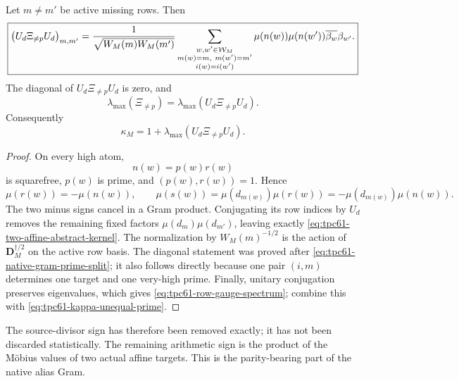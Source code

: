 \begin{proposition}
\label{prop:tpc61-exact-row-gauge}
Let \(m\ne m'\) be active missing rows.  Then
\begin{equation}
 \boxed{
 \bigl(U_d\Xi_{\ne p}U_d\bigr)_{m,m'}
 =\frac{1}{\sqrt{W_M(m)W_M(m')}}
 \sum_{\substack{w,w'\in\mathcal W_M\\
                   m(w)=m,\ m(w')=m'\\
                   i(w)=i(w')}}
 \mu(n(w))\mu(n(w'))
 \overline{\beta_w}\beta_{w'}.}
 \label{eq:tpc61-two-affine-abstract-kernel}
\end{equation}
The diagonal of \(U_d\Xi_{\ne p}U_d\) is zero, and
\begin{equation}
 \lambda_{\max}(\Xi_{\ne p})
 =\lambda_{\max}(U_d\Xi_{\ne p}U_d).
 \label{eq:tpc61-row-gauge-spectrum}
\end{equation}
Consequently
\begin{equation}
 \kappa_M
 =1+\lambda_{\max}(U_d\Xi_{\ne p}U_d).
 \label{eq:tpc61-kappa-parity-gauge}
\end{equation}
\end{proposition}

\begin{proof}
On every high atom,
\[
 n(w)=p(w)r(w)
\]
is squarefree, \(p(w)\) is prime, and \((p(w),r(w))=1\).  Hence
\begin{equation}
 \mu(r(w))=-\mu(n(w)),
 \qquad
 \mu(s(w))
 =\mu(d_{m(w)})\mu(r(w))
 =-\mu(d_{m(w)})\mu(n(w)).
 \label{eq:tpc61-high-sign-calibration}
\end{equation}
The two minus signs cancel in a Gram product.  Conjugating its row indices
by \(U_d\) removes the remaining fixed factors
\(\mu(d_m)\mu(d_{m'})\), leaving exactly
\eqref{eq:tpc61-two-affine-abstract-kernel}.  The normalization by
\(W_M(m)^{-1/2}\) is the action of
\(\mathbf D_M^{\dagger/2}\) on the active row basis.  The diagonal
statement was proved after \eqref{eq:tpc61-native-gram-prime-split}; it
also follows directly because one pair \((i,m)\) determines one target and
one very-high prime.  Finally, unitary conjugation preserves eigenvalues,
which gives \eqref{eq:tpc61-row-gauge-spectrum}; combine this with
\eqref{eq:tpc61-kappa-unequal-prime}.
\end{proof}

The source-divisor sign has therefore been removed exactly; it has not been
discarded statistically.  The remaining arithmetic sign is the product of
the M\"obius values of two actual affine targets.  This is the parity-bearing
part of the native alias Gram.

